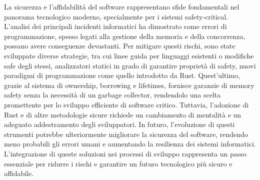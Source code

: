 La sicurezza e l'affidabilità del software rappresentano sfide fondamentali nel panorama tecnologico moderno, specialmente per i sistemi safety-critical. L'analisi dei principali incidenti informatici ha dimostrato come errori di programmazione, spesso legati alla gestione della memoria e della concorrenza, possano avere conseguenze devastanti. Per mitigare questi rischi, sono state sviluppate diverse strategie, tra cui linee guida per linguaggi esistenti o modifiche safe degli stessi, analizzatori statici in grado di garantire proprietà di safety, nuovi paradigmi di programmazione come quello introdotto da Rust. Quest'ultimo, grazie al sistema di ownership, borrowing e lifetimes, fornisce garanzie di memory safety senza la necessità di un garbage collector, rendendolo una scelta promettente per lo sviluppo efficiente di software critico. Tuttavia, l'adozione di Rust e di altre metodologie sicure richiede un cambiamento di mentalità e un adeguato addestramento degli sviluppatori. In futuro, l'evoluzione di questi strumenti potrebbe ulteriormente migliorare la sicurezza del software, rendendo meno probabili gli errori umani e aumentando la resilienza dei sistemi informatici. L'integrazione di queste soluzioni nei processi di sviluppo rappresenta un passo essenziale per ridurre i rischi e garantire un futuro tecnologico più sicuro e affidabile.
